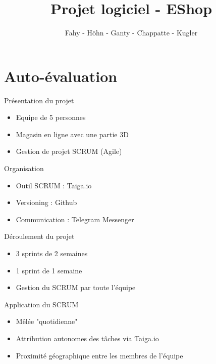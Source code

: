 \documentclass[11pt]{beamer}
\author{ Fahy - Höhn - Ganty - Chappatte - Kugler }
\title{Projet logiciel - EShop}
\institute{ Génie logiciel II\\hepia}
\begin{document}
    \begin{frame}
        \titlepage
    \end{frame}

    \section{Auto-évaluation}
    \begin{frame}{Présentation du projet}
        \begin{itemize}
            \item Equipe de 5 personnes
            \item Magasin en ligne avec une partie 3D
            \item Gestion de projet SCRUM (Agile)
        \end{itemize}
    \end{frame}

    \begin{frame}{Organisation}
        \begin{itemize}
            \item Outil SCRUM : Taiga.io
            \item Versioning : Github
            \item Communication : Telegram Messenger
        \end{itemize}
    \end{frame}

    \begin{frame}{Déroulement du projet}
        \begin{itemize}
            \item 3 sprints de 2 semaines
            \item 1 sprint de 1 semaine
            \item Gestion du SCRUM par toute l'équipe
        \end{itemize}
    \end{frame}

    \begin{frame}{Application du SCRUM}
        \begin{itemize}
            \item Mêlée "quotidienne"
            \item Attribution autonomes des tâches via Taiga.io
            \item Proximité géographique entre les membres de l'équipe
        \end{itemize}
    \end{frame}
\end{document}

